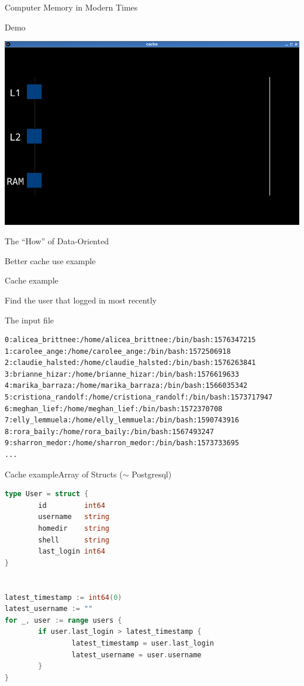 \documentclass[10pt,xcolor=dvipsnames]{beamer}
\renewcommand\big[1]{
  \begin{center}
    \Large{#1}
  \end{center}
}
\begin{document}
\begin{frame}{Computer Memory in Modern Times}
  \big{Demo}
  \centering\includegraphics[scale=0.5]{cache-demo.png}
\end{frame}

\begin{frame}
  \big{The ``How'' of Data-Oriented}
\end{frame}

\begin{frame}
  \big{Better cache use example}
\end{frame}

\begin{frame}{Cache example}
  \big{Find the user that logged in most recently}
\end{frame}

\begin{frame}[fragile]{The input file}
  \begin{lstlisting}
0:alicea_brittnee:/home/alicea_brittnee:/bin/bash:1576347215
1:carolee_ange:/home/carolee_ange:/bin/bash:1572506918
2:claudie_halsted:/home/claudie_halsted:/bin/bash:1576263841
3:brianne_hizar:/home/brianne_hizar:/bin/bash:1576619633
4:marika_barraza:/home/marika_barraza:/bin/bash:1566035342
5:cristiona_randolf:/home/cristiona_randolf:/bin/bash:1573717947
6:meghan_lief:/home/meghan_lief:/bin/bash:1572370708
7:elly_lemmuela:/home/elly_lemmuela:/bin/bash:1590743916
8:rora_baily:/home/rora_baily:/bin/bash:1567493247
9:sharron_medor:/home/sharron_medor:/bin/bash:1573733695
...
  \end{lstlisting}
\end{frame}

\begin{frame}[fragile]{Cache example}{Array of Structs ($\sim$ Postgresql)}
  \begin{lstlisting}[language = Go]
type User = struct {
        id         int64
        username   string
        homedir    string
        shell      string
        last_login int64
}


latest_timestamp := int64(0)
latest_username := ""
for _, user := range users {
        if user.last_login > latest_timestamp {
                latest_timestamp = user.last_login
                latest_username = user.username
        }
}
\end{lstlisting}
\end{frame}
\end{document}
